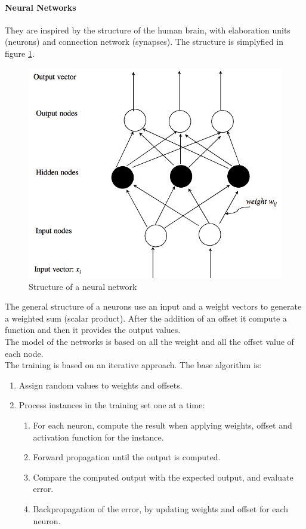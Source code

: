\documentclass[12pt]{article}
\begin{document}
\paragraph{Neural Networks} They are inspired by the structure of the human brain, with elaboration units (neurons) and connection network (synapses). The structure is simplyfied in figure \ref{fig:str_net}.
\begin{figure}[H]
  \includegraphics[width=\linewidth]{images/str_net.png}
  \caption{Structure of a neural network}
  \label{fig:str_net}
\end{figure}
The general structure of a neurons use an input and a weight vectors to generate a weighted sum (scalar product). After the addition of an offset it compute a function and then it provides the output values.\\
The model of the networks is based on all the weight and all the offset value of each node.\\
The training is based on an iterative approach. The base algorithm is:
\begin{enumerate}
  \item Assign random values to weights and offsets.
  \item Process instances in the training set one at a time:
  \begin{enumerate}
    \item For each neuron, compute the result when applying weights, offset and activation function for the instance.
    \item Forward propagation until the output is computed.
    \item Compare the computed output with the expected output, and evaluate error.
    \item Backpropagation of the error, by updating weights and offset for each neuron.
  \end{enumerate}
\end{enumerate}
\end{document}

